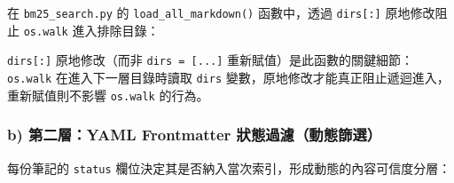 在 \texttt{bm25\_search.py} 的 \texttt{load\_all\_markdown()}
函數中，透過 \texttt{dirs{[}:{]}} 原地修改阻止 \texttt{os.walk}
進入排除目錄：

\begin{Shaded}
\begin{Highlighting}[]
\OperatorTok{=}\NormalTok{ \{}
    \NormalTok{, }\NormalTok{, }\NormalTok{, }\NormalTok{,}
    \NormalTok{, }\NormalTok{, }
\NormalTok{\}}

\OperatorTok{=}\NormalTok{ [], []}
\OperatorTok{=}\NormalTok{ [d } \NormalTok{ EXCLUDE\_DIRS]}
            \NormalTok{):}
                 
\NormalTok{                       [}\NormalTok{, }\NormalTok{, }\NormalTok{, }\NormalTok{]):}
\end{Highlighting}
\end{Shaded}

\texttt{dirs{[}:{]}} 原地修改（而非 \texttt{dirs\ =\ {[}...{]}}
重新賦值）是此函數的關鍵細節：\texttt{os.walk} 在進入下一層目錄時讀取
\texttt{dirs} 變數，原地修改才能真正阻止遞迴進入，重新賦值則不影響
\texttt{os.walk} 的行為。

\subsubsection{b) 第二層：YAML Frontmatter
狀態過濾（動態篩選）}\label{b-ux7b2cux4e8cux5c64yaml-frontmatter-ux72c0ux614bux904eux6ffeux52d5ux614bux7be9ux9078}

每份筆記的 \texttt{status}
欄位決定其是否納入當次索引，形成動態的內容可信度分層：


